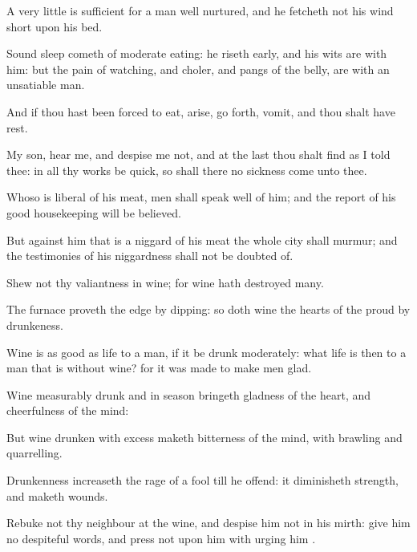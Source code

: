 {\par }{\PP {}A very little is sufficient for a man well nurtured, and he fetcheth not his wind short upon his bed.
\par }{\PP {}Sound sleep cometh of moderate eating: he riseth early, and his wits are with him: but the pain of watching, and choler, and pangs of the belly, are with an unsatiable man.
\par }{\PP {}And if thou hast been forced to eat, arise, go forth, vomit, and thou shalt have rest.
\par }{\PP {}My son, hear me, and despise me not, and at the last thou shalt find as I told thee: in all thy works be quick, so shall there no sickness come unto thee.
\par }{\PP {}Whoso is liberal of his meat, men shall speak well of him; and the report of his good housekeeping will be believed.
\par }{\PP {}But against him that is a niggard of his meat the whole city shall murmur; and the testimonies of his niggardness shall not be doubted of.
\par }{\PP {}Shew not thy valiantness in wine; for wine hath destroyed many.
\par }{\PP {}The furnace proveth the edge by dipping: so doth wine the hearts of the proud by drunkeness.
\par }{\PP {}Wine is as good as life to a man, if it be drunk moderately: what life is then to a man that is without wine? for it was made to make men glad.
\par }{\PP {}Wine measurably drunk and in season bringeth gladness of the heart, and cheerfulness of the mind:
\par }{\PP {}But wine drunken with excess maketh bitterness of the mind, with brawling and quarrelling.
\par }{\PP {}Drunkenness increaseth the rage of a fool till he offend: it diminisheth strength, and maketh wounds.
\par }{\PP {}Rebuke not thy neighbour at the wine, and despise him not in his mirth: give him no despiteful words, and press not upon him with urging him
{}.

}
